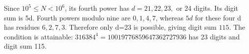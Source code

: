 Since $10^5\le N<10^6$, its fourth power has $d=21,22,23,$ or 24 digits. Its digit sum is 5d. Fourth powers modulo nine are $0,1,4,7$, whereas $5d$ for these four d has residues $6,2,7,3$. Therefore only d=23 is possible, giving digit sum $\boxed{115}$. The condition is attainable: $316384^4=10019776859647362727936$ has 23 digits and digit sum 115.

